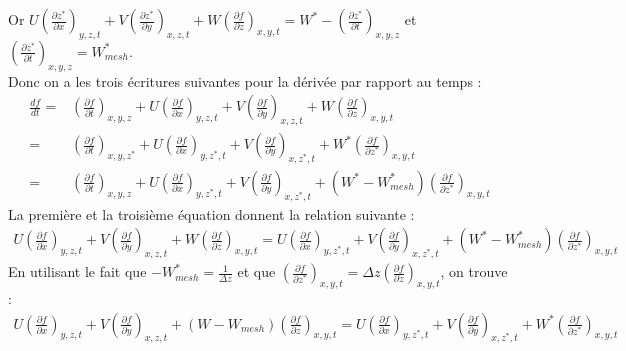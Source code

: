 Or $ U \left(\frac{\partial z^*}{\partial x}\right)_{y,z,t} +V \left(\frac{\partial z^*}{\partial y}\right)_{x,z,t}+ W \left(\frac{\partial f}{\partial z}\right)_{x,y,t} = W^* - \left(\frac{\partial z^*}{\partial t}\right)_{x,y,z}$ et $\left(\frac{\partial z^*}{\partial t}\right)_{x,y,z} = W^*_{mesh}$.\\
Donc on a les trois écritures suivantes pour la dérivée par rapport au temps :
\begin{align*}
\frac{d f}{d t} =& \left(\frac{\partial f}{\partial t}\right)_{x,y,z} + U \left(\frac{\partial f}{\partial x}\right)_{y,z,t} +V \left(\frac{\partial f}{\partial y}\right)_{x,z,t}+ W \left(\frac{\partial f}{\partial z}\right)_{x,y,t}\\
=&\left(\frac{\partial f}{\partial t}\right)_{x,y,z^*} + U \left(\frac{\partial f}{\partial x}\right)_{y,z^*,t} + V \left(\frac{\partial f}{\partial y}\right)_{x,z^*,t} + W^*\left(\frac{\partial f}{\partial z^*}\right)_{x,y,t}\\
=& \left(\frac{\partial f}{\partial t}\right)_{x,y,z} +  U \left(\frac{\partial f}{\partial x}\right)_{y,z^*,t} + V \left(\frac{\partial f}{\partial y}\right)_{x,z^*,t} + (W^* -W^*_{mesh} )\left(\frac{\partial f}{\partial z^*}\right)_{x,y,t}
\end{align*}
La première et la troisième équation donnent la relation suivante :
\begin{align*}
U \left(\frac{\partial f}{\partial x}\right)_{y,z,t} +V \left(\frac{\partial f}{\partial y}\right)_{x,z,t}+ W \left(\frac{\partial f}{\partial z}\right)_{x,y,t} = U \left(\frac{\partial f}{\partial x}\right)_{y,z^*,t} + V \left(\frac{\partial f}{\partial y}\right)_{x,z^*,t} + (W^* -W^*_{mesh} )\left(\frac{\partial f}{\partial z^*}\right)_{x,y,t}
\end{align*}
En utilisant le fait que $-W^*_{mesh} =\frac{1}{\Delta z}$ et que $\left(\frac{\partial f}{\partial z^*}\right)_{x,y,t}=\Delta z \left(\frac{\partial f}{\partial z}\right)_{x,y,t} $, on trouve :
\begin{align*}
U \left(\frac{\partial f}{\partial x}\right)_{y,z,t} +V \left(\frac{\partial f}{\partial y}\right)_{x,z,t}+ (W-W_{mesh}) \left(\frac{\partial f}{\partial z}\right)_{x,y,t} = U \left(\frac{\partial f}{\partial x}\right)_{y,z^*,t} + V \left(\frac{\partial f}{\partial y}\right)_{x,z^*,t} + W^* \left(\frac{\partial f}{\partial z^*}\right)_{x,y,t}
\end{align*}
